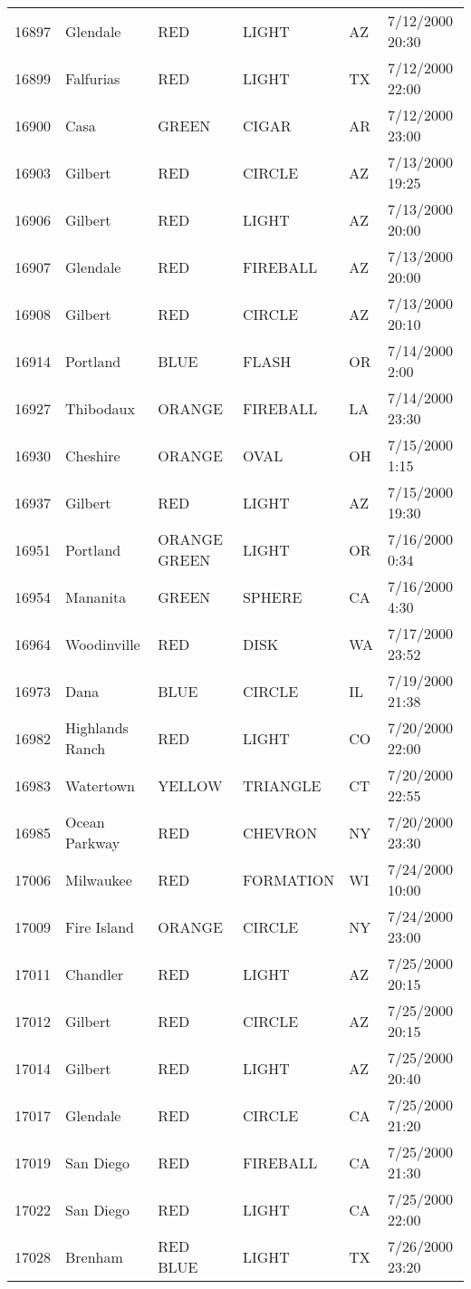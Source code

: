 \begin{tabular}{llllll}
16897 & Glendale & RED & LIGHT & AZ & 7/12/2000 20:30 \\
16899 & Falfurias & RED & LIGHT & TX & 7/12/2000 22:00 \\
16900 & Casa & GREEN & CIGAR & AR & 7/12/2000 23:00 \\
16903 & Gilbert & RED & CIRCLE & AZ & 7/13/2000 19:25 \\
16906 & Gilbert & RED & LIGHT & AZ & 7/13/2000 20:00 \\
16907 & Glendale & RED & FIREBALL & AZ & 7/13/2000 20:00 \\
16908 & Gilbert & RED & CIRCLE & AZ & 7/13/2000 20:10 \\
16914 & Portland & BLUE & FLASH & OR & 7/14/2000 2:00 \\
16927 & Thibodaux & ORANGE & FIREBALL & LA & 7/14/2000 23:30 \\
16930 & Cheshire & ORANGE & OVAL & OH & 7/15/2000 1:15 \\
16937 & Gilbert & RED & LIGHT & AZ & 7/15/2000 19:30 \\
16951 & Portland & ORANGE GREEN & LIGHT & OR & 7/16/2000 0:34 \\
16954 & Mananita & GREEN & SPHERE & CA & 7/16/2000 4:30 \\
16964 & Woodinville & RED & DISK & WA & 7/17/2000 23:52 \\
16973 & Dana & BLUE & CIRCLE & IL & 7/19/2000 21:38 \\
16982 & Highlands Ranch & RED & LIGHT & CO & 7/20/2000 22:00 \\
16983 & Watertown & YELLOW & TRIANGLE & CT & 7/20/2000 22:55 \\
16985 & Ocean Parkway & RED & CHEVRON & NY & 7/20/2000 23:30 \\
17006 & Milwaukee & RED & FORMATION & WI & 7/24/2000 10:00 \\
17009 & Fire Island & ORANGE & CIRCLE & NY & 7/24/2000 23:00 \\
17011 & Chandler & RED & LIGHT & AZ & 7/25/2000 20:15 \\
17012 & Gilbert & RED & CIRCLE & AZ & 7/25/2000 20:15 \\
17014 & Gilbert & RED & LIGHT & AZ & 7/25/2000 20:40 \\
17017 & Glendale & RED & CIRCLE & CA & 7/25/2000 21:20 \\
17019 & San Diego & RED & FIREBALL & CA & 7/25/2000 21:30 \\
17022 & San Diego & RED & LIGHT & CA & 7/25/2000 22:00 \\
17028 & Brenham & RED BLUE & LIGHT & TX & 7/26/2000 23:20 \\

\end{tabular}

